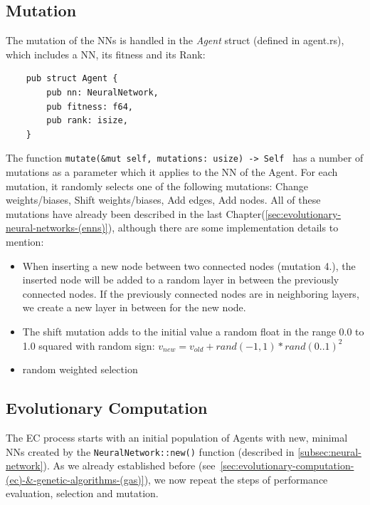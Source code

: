 \documentclass[11pt]{report}
\begin{document}
\begin{enumerate}
            \subsection{Mutation}\label{subsec:mutation}
    The mutation of the NNs is handled in the \textit{Agent} struct (defined in agent.rs), which includes a NN, its fitness and its Rank:
    \begin{verbatim}
    pub struct Agent {
        pub nn: NeuralNetwork,
        pub fitness: f64,
        pub rank: isize,
    }
    \end{verbatim}
    The function \texttt{mutate(&mut self, mutations: usize) -> Self {} } has a number of mutations as a parameter which it applies to the NN of the Agent.
    For each mutation, it randomly selects one of the following mutations: Change weights/biases, Shift weights/biases, Add edges, Add nodes.
    All of these mutations have already been described in the last Chapter(\ref{sec:evolutionary-neural-networks-(enns)}), although there are some implementation details to mention:
    \begin{itemize}
        \item When inserting a new node between two connected nodes (mutation 4.), the inserted node will be added to a random layer in between the previously connected nodes.
        If the previously connected nodes are in neighboring layers, we create a new layer in between for the new node.
        \item The shift mutation adds to the initial value a random float in the range 0.0 to 1.0 squared with random sign:
        $v_{new} = v_{old} + rand(-1, 1) * rand(0..1)^2$
        \item random weighted selection
    \end{itemize}

            \subsection{Evolutionary Computation}\label{subsec:natural-slection}
    The EC process starts with an initial population of Agents with new, minimal NNs created by the \texttt{NeuralNetwork::new()} function (described in \ref{subsec:neural-network}).
    As we already established before (see~\ref{sec:evolutionary-computation-(ec)-&-genetic-algorithms-(gas)}), we now repeat the steps of performance evaluation, selection and mutation.

\end{enumerate}
\end{document}
